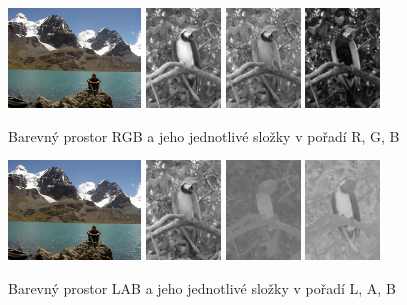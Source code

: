 \documentclass[czech,BP]{thesiskiv}
\begin{document}
\begin{figure}[H]
		\centering
		\includegraphics[height=100px]{./img/img_histogram.jpg}
		\includegraphics[height=100px]{./img/bgr_r.jpg}
		\includegraphics[height=100px]{./img/bgr_g.jpg}
		\includegraphics[height=100px]{./img/bgr_b.jpg}	
		\caption{Barevný prostor RGB a jeho jednotlivé složky v pořadí R, G, B}
\end{figure}

\begin{figure}[H]
		\centering
		\includegraphics[height=100px]{./img/img_histogram.jpg}
		\includegraphics[height=100px]{./img/lab_l.jpg}
		\includegraphics[height=100px]{./img/lab_a.jpg}
		\includegraphics[height=100px]{./img/lab_b.jpg}	
		\caption{Barevný prostor LAB a jeho jednotlivé složky v pořadí L, A, B}
\end{figure}
\end{document}
